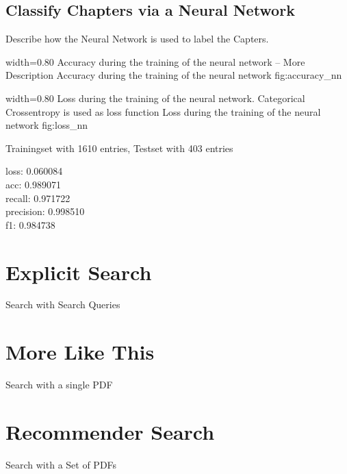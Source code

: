 \subsection{Classify Chapters via a Neural Network}
\label{subsec:creating-feature-vector}

Describe how the Neural Network is used to label the Capters.

      {width=0.80\textwidth}
      {Accuracy during the training of the neural network -- More Description}
      {Accuracy during the training of the neural network}
      {fig:accuracy_nn}

      {width=0.80\textwidth}
      {Loss during the training of the neural network. Categorical Crossentropy is used as loss function}
      {Loss during the training of the neural network}
      {fig:loss_nn}
      
Trainingset with 1610 entries, Testset with 403 entries

loss: 0.060084        \\
acc: 0.989071         \\
recall: 0.971722      \\
precision: 0.998510   \\
f1: 0.984738










\section{Explicit Search}
\label{sec:explicit-search}

Search with Search Queries

\section{More Like This} %
\label{sec:more-like-this}

Search with a single PDF

\section{Recommender Search}
\label{sec:recommender-search}

Search with a Set of PDFs